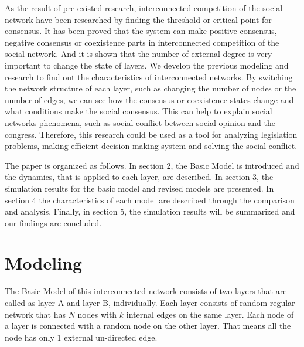\documentclass[english]{cccconf}
\begin{document}
As the result of pre-existed research, interconnected competition of the social network have been researched by finding the threshold or critical point for consensus\cite{alvarez2016, gomez2015, diep2017}. It has been proved that the system can make positive consensus, negative consensus or coexistence parts in interconnected competition of the social network\cite{alvarez2016}. And it is shown that the number of external degree is very important to change the state of layers\cite{gomez2015}. We develop the previous modeling and research to find out the characteristics of interconnected networks. By switching the network structure of each layer, such as changing the number of nodes or the number of edges, we can see how the consensus or coexistence states change and what conditions make the social consensus. This can help to explain social networks phenomena, such as social conflict between social opinion and the congress. Therefore, this research could be used as a tool for analyzing legislation problems, making efficient decision-making system and solving the social conflict. 

The paper is organized as follows. In section 2, the Basic Model is introduced and the dynamics, that is applied to each layer, are described.  In section 3, the simulation results for the basic model and revised models are presented. In section 4 the characteristics of each model are described through the comparison and analysis. Finally, in section 5, the simulation results will be summarized and our findings are concluded.

\section{Modeling}
The Basic Model of this interconnected network consists of two layers that are called as layer A and layer B, individually. Each layer consists of random regular network that has $N$ nodes with $k$ internal edges on the same layer. Each node of a layer is connected with a random node on the other layer. That means all the node has only 1 external un-directed edge.
\end{document}
